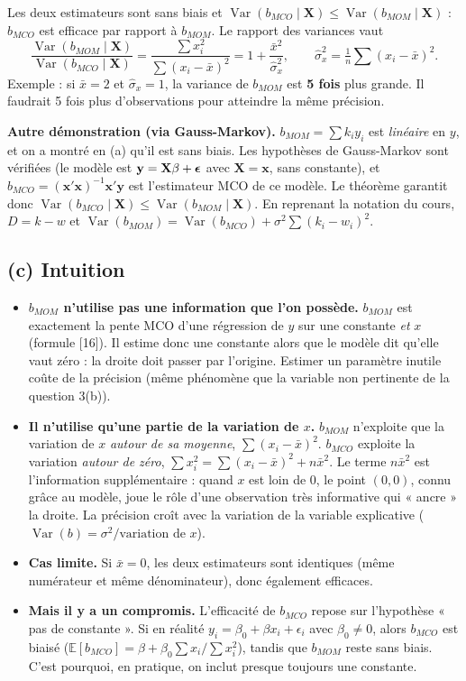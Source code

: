 \documentclass[11pt,a4paper]{article}
\newcommand{\vy}{\mathbf{y}}\newcommand{\vX}{\mathbf{X}}\newcommand{\vZ}{\mathbf{Z}}
\newcommand{\E}{\mathbb{E}}\newcommand{\Var}{\operatorname{Var}}\newcommand{\Cov}{\operatorname{Cov}}
\begin{document}
\begin{reponse}
Les deux estimateurs sont sans biais et $\Var(b_{MCO}\mid\vX)\le\Var(b_{MOM}\mid\vX)$ : $b_{MCO}$ est efficace par rapport à $b_{MOM}$. Le rapport des variances vaut
\[
\frac{\Var(b_{MOM}\mid\vX)}{\Var(b_{MCO}\mid\vX)}=\frac{\sum x_i^2}{\sum(x_i-\bar x)^2}=1+\frac{\bar x^2}{\hat\sigma_x^2},\qquad \hat\sigma_x^2=\tfrac1n\textstyle\sum(x_i-\bar x)^2 .
\]
Exemple : si $\bar x=2$ et $\hat\sigma_x=1$, la variance de $b_{MOM}$ est \textbf{5 fois} plus grande. Il faudrait 5 fois plus d'observations pour atteindre la même précision.
\end{reponse}

\textbf{Autre démonstration (via Gauss-Markov).} $b_{MOM}=\sum k_iy_i$ est \emph{linéaire} en $y$, et on a montré en (a) qu'il est sans biais. Les hypothèses de Gauss-Markov sont vérifiées (le modèle est $\vy=\vX\beta+\veps$ avec $\vX=\mathbf x$, sans constante), et $b_{MCO}=(\mathbf x'\mathbf x)^{-1}\mathbf x'\vy$ est l'estimateur MCO de ce modèle. Le théorème garantit donc $\Var(b_{MCO}\mid\vX)\le\Var(b_{MOM}\mid\vX)$. En reprenant la notation du cours, $D=k-w$ et $\Var(b_{MOM})=\Var(b_{MCO})+\sigma^2\sum(k_i-w_i)^2$.

\subsection{(c) Intuition}

\begin{intuition}
\begin{itemize}
\item \textbf{$b_{MOM}$ n'utilise pas une information que l'on possède.} $b_{MOM}$ est exactement la pente MCO d'une régression de $y$ sur une constante \emph{et} $x$ (formule [16]). Il estime donc une constante alors que le modèle dit qu'elle vaut zéro : la droite doit passer par l'origine. Estimer un paramètre inutile coûte de la précision (même phénomène que la variable non pertinente de la question 3(b)).
\item \textbf{Il n'utilise qu'une partie de la variation de $x$.} $b_{MOM}$ n'exploite que la variation de $x$ \emph{autour de sa moyenne}, $\sum(x_i-\bar x)^2$. $b_{MCO}$ exploite la variation \emph{autour de zéro}, $\sum x_i^2=\sum(x_i-\bar x)^2+n\bar x^2$. Le terme $n\bar x^2$ est l'information supplémentaire : quand $x$ est loin de 0, le point $(0,0)$, connu grâce au modèle, joue le rôle d'une observation très informative qui « ancre » la droite. La précision croît avec la variation de la variable explicative ($\Var(b)=\sigma^2/\text{variation de }x$).
\item \textbf{Cas limite.} Si $\bar x=0$, les deux estimateurs sont identiques (même numérateur et même dénominateur), donc également efficaces.
\item \textbf{Mais il y a un compromis.} L'efficacité de $b_{MCO}$ repose sur l'hypothèse « pas de constante ». Si en réalité $y_i=\beta_0+\beta x_i+\epsilon_i$ avec $\beta_0\ne0$, alors $b_{MCO}$ est biaisé ($\E[b_{MCO}]=\beta+\beta_0\sum x_i/\sum x_i^2$), tandis que $b_{MOM}$ reste sans biais. C'est pourquoi, en pratique, on inclut presque toujours une constante.
\end{itemize}
\end{intuition}
\end{document}
